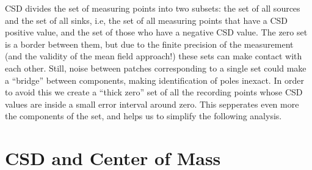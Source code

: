 \documentclass{article}
\begin{document}
CSD divides the set of measuring points into two subsets: the set of all sources and the set of all sinks, i.e, the set of all measuring points that have a CSD positive value, and the set of those who have a negative CSD value. The zero set is a border between them, but due to the finite precision of the measurement (and the validity of the mean field approach!) these sets can make contact with each other. Still, noise between patches corresponding to a single set could make a ``bridge'' between components, making identification of poles inexact. In order to avoid this we create a ``thick zero'' set of all the recording points whose CSD values are inside a small error interval around zero. This sepperates even more the components of the set, and helps us to simplify the following analysis. 

\section{CSD and Center of Mass}
\end{document}
